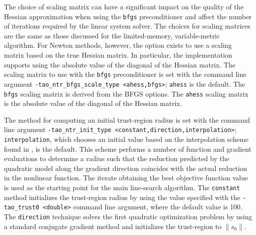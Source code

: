The choice of scaling matrix can have a significant impact on the quality 
of the Hessian approximation when using the {\tt bfgs} preconditioner and
affect the number of iterations required by the linear system solver.
The choices for scaling matrices are the same as those discussed for 
the limited-memory, variable-metric algorithm.  For Newton methods,
however, the option exists to use a scaling matrix based on the true
Hessian matrix.  In particular, the implementation supports using the 
absolute value of the diagonal of the Hessian matrix.  The scaling 
matrix to use with the {\tt bfgs} preconditioner is set with the 
command line argument {\tt -tao\_ntr\_bfgs\_scale\_type <ahess,bfgs>}; 
{\tt ahess} is the default.  The {\tt bfgs} scaling matrix is derived from 
the BFGS options.  The {\tt ahess} scaling matrix is the absolute value of 
the diagonal of the Hessian matrix.

The method for computing an initial trust-region radius is set with the 
command line argument {\tt -tao\_ntr\_init\_type <constant,direction,interpolation>};
{\tt interpolation}, which chooses an initial value based on the 
interpolation scheme found in \cite{CGT}, is the default.  This
scheme performs a number of function and gradient evaluations to determine 
a radius such that the reduction predicted by the quadratic model along the 
gradient direction coincides with the actual reduction in the nonlinear 
function.  The iterate obtaining the best objective function value is 
used as the starting point for the main line-search algorithm.  The 
{\tt constant} method initializes the trust-region radius by using 
the value specified with the {\tt -tao\_trust0 <double>} command line 
argument, where the default value is 100.  The {\tt direction} technique 
solves the first quadratic optimization problem by using a standard 
conjugate gradient method and initializes the trust-region to 
$\|s_0\|$.

